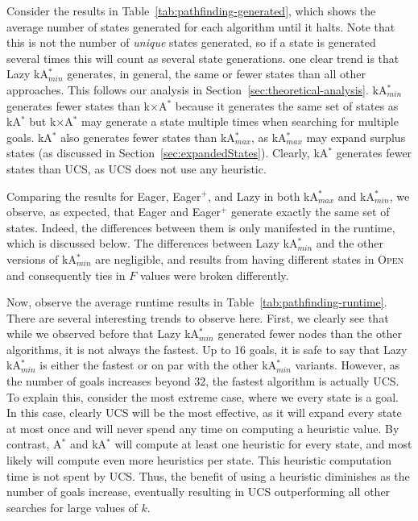 \documentclass{aicom2e}
\newcommand{\astar}{A$^*$}
\newcommand{\kastar}{kA$^*$}
\newcommand{\kastarmin}{kA$^*_{min}$}
\newcommand{\kastarmax}{kA$^*_{max}$}
\newcommand{\kxastar}{k$\times$A$^*$}
\newcommand{\open}{\textsc{Open}}
\begin{document}
Consider the results in Table~\ref{tab:pathfinding-generated},
which shows the average number of states generated for each algorithm until it halts. Note that this is not the number of {\em unique} states generated, so if a state is generated several times this will count as several state generations.
one clear trend is that Lazy \kastarmin{} generates, in general, the same or fewer states than all other approaches.
This follows our analysis in Section~\ref{sec:theoretical-analysis}. \kastarmin{} generates fewer states than \kxastar{} because it generates the same set of states as \kastar{} but \kxastar{} may generate a state multiple times when searching for multiple goals. \kastar{} also generates fewer states than \kastarmax{}, as \kastarmax{} may expand surplus states (as discussed in Section~\ref{sec:expandedStates}). Clearly, \kastar{} generates fewer states than UCS, as UCS does not use any heuristic.

Comparing the results for Eager, Eager$^+$, and Lazy in both \kastarmax{} and \kastarmin{}, we observe, as expected, that Eager and Eager$^+$ generate exactly the same set of states. Indeed, the differences between them is only manifested in the runtime, which is discussed below. The differences between Lazy \kastarmin{} and the other versions of \kastarmin{} are negligible, and results from having different states in \open{} and consequently ties in $F$ values were broken differently.


Now, observe the average runtime results in Table~\ref{tab:pathfinding-runtime}.
There are several interesting trends to observe here. First, we clearly see that while we observed before that Lazy \kastarmin{} generated fewer nodes than the other algorithms, it is not always the fastest. Up to 16 goals, it is safe to say that Lazy \kastarmin{} is either the fastest or on par with the other \kastarmin{} variants. However, as the number of goals increases beyond 32, the fastest algorithm is actually UCS. To explain this, consider the most extreme case, where we every state is a goal. In this case, clearly UCS will be the most effective, as it will expand every state at most once and will never spend any time on computing a heuristic value. By contrast, \astar{} and \kastar{} will compute at least one heuristic for every state, and most likely will compute even more heuristics per state. This heuristic computation time is not spent by UCS. Thus, the benefit of using a heuristic diminishes as the number of goals increase, eventually resulting in UCS outperforming all other searches for large values of $k$. %
\end{document}
